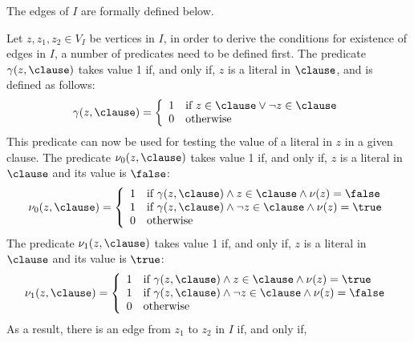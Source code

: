 The edges of $I$ are formally defined below.  

\begin{definition}
    Let $z, z_1, z_2 \in V_I$ be vertices in $I$, in order to derive the
    conditions for existence of edges in $I$, a number of predicates need to be
    defined first.  The predicate $\gamma(z, \clause)$ takes value 1 if, and
    only if, $z$ is a literal in $\clause$, and is defined as follows:
    \begin{equation}
        \gamma(z, \clause) = 
        \left\{
            \begin{array}{ll}
                1 & \text{if $z \in \clause \lor \neg z \in \clause$} \\
                0 & \text{otherwise}
            \end{array}
        \right.
    \end{equation}
    This predicate can now be used for testing the value of a literal in $z$ in
    a given clause. The predicate $\nu_0(z, \clause)$ takes value 1 if, and only
    if, $z$ is a literal in $\clause$ and its value is $\false$:
    \begin{equation}
        \nu_0(z, \clause) = 
        \left\{
            \begin{array}{ll}
                1 & \text{if $\gamma(z, \clause) \land z \in \clause \land \nu(z) = \false$}\\
                1 & \text{if $\gamma(z, \clause) \land \neg z \in \clause \land
                \nu(z) = \true$}\\
                0 & \text{otherwise}
            \end{array}
        \right.
    \end{equation}
    The predicate $\nu_1(z, \clause)$ takes value 1 if, and only if, $z$ is a
    literal in $\clause$ and its value is $\true$:
    \begin{equation}
        \nu_1(z, \clause) = 
        \left\{
            \begin{array}{ll}
                1 & \text{if $\gamma(z, \clause) \land z \in \clause \land
                \nu(z) = \true$}\\
                1 & \text{if $\gamma(z, \clause) \land \neg z \in \clause \land
                \nu(z) = \false$}\\
                0 & \text{otherwise}
            \end{array}
        \right.
    \end{equation}
    As a result, there is an edge from $z_1$ to $z_2$ in $I$ if, and only if,

\end{definition}
